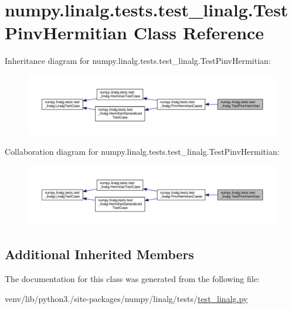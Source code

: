 \hypertarget{classnumpy_1_1linalg_1_1tests_1_1test__linalg_1_1TestPinvHermitian}{}\section{numpy.\+linalg.\+tests.\+test\+\_\+linalg.\+Test\+Pinv\+Hermitian Class Reference}
\label{classnumpy_1_1linalg_1_1tests_1_1test__linalg_1_1TestPinvHermitian}


Inheritance diagram for numpy.\+linalg.\+tests.\+test\+\_\+linalg.\+Test\+Pinv\+Hermitian\+:
\nopagebreak
\begin{figure}[H]
\begin{center}
\leavevmode
\includegraphics[width=350pt]{classnumpy_1_1linalg_1_1tests_1_1test__linalg_1_1TestPinvHermitian__inherit__graph}
\end{center}
\end{figure}


Collaboration diagram for numpy.\+linalg.\+tests.\+test\+\_\+linalg.\+Test\+Pinv\+Hermitian\+:
\nopagebreak
\begin{figure}[H]
\begin{center}
\leavevmode
\includegraphics[width=350pt]{classnumpy_1_1linalg_1_1tests_1_1test__linalg_1_1TestPinvHermitian__coll__graph}
\end{center}
\end{figure}
\subsection*{Additional Inherited Members}


The documentation for this class was generated from the following file\+:\begin{DoxyCompactItemize}
\item 
venv/lib/python3./site-\/packages/numpy/linalg/tests/\hyperlink{test__linalg_8py}{test\+\_\+linalg.\+py}\end{DoxyCompactItemize}
